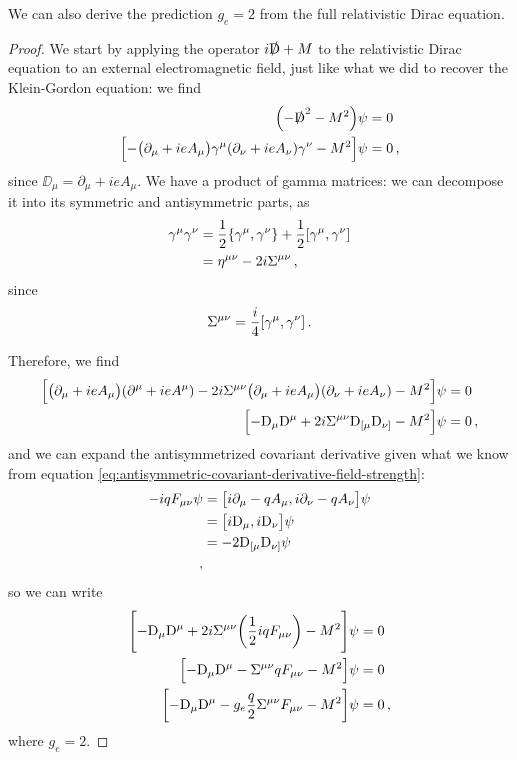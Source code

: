 \documentclass[main.tex]{subfiles}
\begin{document}
\begin{claim}
We can also derive the prediction \(g_e = 2\) from the full relativistic Dirac equation.
\end{claim}

\begin{proof}
We start by applying the operator \(i\slashed{\mathrm{D}} + M\) to the relativistic Dirac equation to an external electromagnetic field, just like what we did to recover the Klein-Gordon equation: we find 
%
\begin{align}
\qty(-\slashed{\mathrm{D}}^2 - M^2) \psi &= 0  \\
\qty[ - \qty(\partial_{\mu } +ieA_{\mu }) \gamma^{\mu } \qty(\partial_{\nu } + ieA_{\nu }) \gamma^{\nu } - M^2] \psi  & =0
\,,
\end{align}
%
since \(\DD_{\mu } = \partial_{\mu } + ieA_{\mu }\).
We have a product of gamma matrices: we can decompose it into its symmetric and antisymmetric parts, as 
%
\begin{align}
\gamma^{\mu } \gamma^{\nu } &= \frac{1}{2} \qty{\gamma^{\mu }, \gamma^{\nu }}  + \frac{1}{2} \qty[\gamma^{\mu } , \gamma^{\nu }]\\
&= \eta^{\mu \nu } -2i \Sigma^{\mu \nu }
\,,
\end{align}
%
since 
%
\begin{align}
\Sigma^{\mu \nu } = \frac{i}{4} \qty[\gamma^{\mu }, \gamma^{\nu }]
\,.
\end{align}

Therefore, we find 
%
\begin{align}
\qty[\qty(\partial_{\mu } + i e A_{\mu }) \qty(\partial^{\mu } + i e A^{\mu }) - 2i \Sigma^{\mu \nu } \qty(\partial_{\mu } +ieA_{\mu }) \qty(\partial_{\nu } + ieA_{\nu }) - M^2] \psi &= 0  \\
\qty[-\mathrm{D}_{\mu } \mathrm{D}^{\mu} + 2i \Sigma^{\mu \nu } \mathrm{D}_{[\mu } \mathrm{D}_{\nu ]}  - M^2] \psi &= 0
\,,
\end{align}
%
and we can expand the antisymmetrized covariant derivative given what we know from equation \eqref{eq:antisymmetric-covariant-derivative-field-strength}: 
%
\begin{align}
-iq F_{\mu \nu } \psi &=
\qty[i \partial_{\mu } - q A_{\mu}, i \partial_{\nu } - q A_{\nu }] \psi \\
&= \qty[i \mathrm{D}_{\mu }, i \mathrm{D}_{\nu }]\psi  \\
&= - 2 \mathrm{D}_{[\mu } \mathrm{D}_{\nu ]} \psi  \\
\,,
\end{align}
%
so we can write 
%
\begin{align}
\qty[-\mathrm{D}_{\mu } \mathrm{D}^{\mu} + 2i \Sigma^{\mu \nu } \qty(\frac{1}{2} iq F_{\mu \nu }) - M^2] \psi &= 0  \\
\qty[-\mathrm{D}_{\mu } \mathrm{D}^{\mu} - \Sigma^{\mu \nu }  q F_{\mu \nu } - M^2] \psi &= 0  \\
\qty[-\mathrm{D}_{\mu } \mathrm{D}^{\mu} - g_e \frac{q}{2} \Sigma^{\mu \nu }  F_{\mu \nu } - M^2] \psi &= 0 
\,,
\end{align}
where \(g_e = 2\). 
\end{proof}
\end{document}

